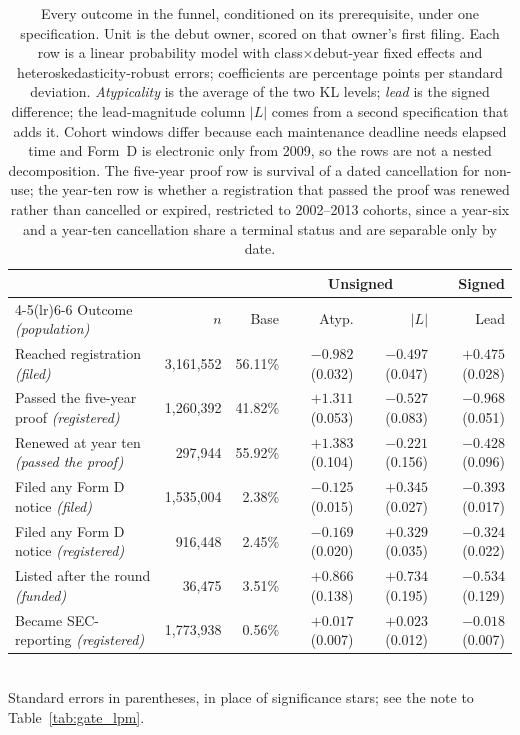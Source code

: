 \begin{table}[!htbp]\centering\footnotesize
\caption{Every outcome in the funnel, conditioned on its prerequisite, under one specification. Unit is the debut owner, scored on that owner's first filing. Each row is a linear probability model with class$\times$debut-year fixed effects and heteroskedasticity-robust errors; coefficients are percentage points per standard deviation. \emph{Atypicality} is the average of the two KL levels; \emph{lead} is the signed difference; the lead-magnitude column $|L|$ comes from a second specification that adds it. Cohort windows differ because each maintenance deadline needs elapsed time and Form~D is electronic only from 2009, so the rows are not a nested decomposition. The five-year proof row is survival of a dated cancellation for non-use; the year-ten row is whether a registration that passed the proof was renewed rather than cancelled or expired, restricted to 2002--2013 cohorts, since a year-six and a year-ten cancellation share a terminal status and are separable only by date.}
\label{tab:staged}
\begin{tabular}{lrrrrr}
\toprule
 & & & \multicolumn{2}{c}{Unsigned} & Signed \\
\cmidrule(lr){4-5}\cmidrule(lr){6-6}
Outcome \emph{(population)} & $n$ & Base & Atyp. & $|L|$ & Lead \\
\midrule
Reached registration \emph{(filed)} & 3,161,552 & 56.11\% & $-0.982$ (0.032) & $-0.497$ (0.047) & $+0.475$ (0.028) \\
Passed the five-year proof \emph{(registered)} & 1,260,392 & 41.82\% & $+1.311$ (0.053) & $-0.527$ (0.083) & $-0.968$ (0.051) \\
Renewed at year ten \emph{(passed the proof)} & 297,944 & 55.92\% & $+1.383$ (0.104) & $-0.221$ (0.156) & $-0.428$ (0.096) \\
Filed any Form D notice \emph{(filed)} & 1,535,004 & 2.38\% & $-0.125$ (0.015) & $+0.345$ (0.027) & $-0.393$ (0.017) \\
Filed any Form D notice \emph{(registered)} & 916,448 & 2.45\% & $-0.169$ (0.020) & $+0.329$ (0.035) & $-0.324$ (0.022) \\
Listed after the round \emph{(funded)} & 36,475 & 3.51\% & $+0.866$ (0.138) & $+0.734$ (0.195) & $-0.534$ (0.129) \\
Became SEC-reporting \emph{(registered)} & 1,773,938 & 0.56\% & $+0.017$ (0.007) & $+0.023$ (0.012) & $-0.018$ (0.007) \\
\bottomrule
\end{tabular}
\\[0.3em]\footnotesize Standard errors in parentheses, in place of significance stars; see the note to Table~\ref{tab:gate_lpm}.
\end{table}